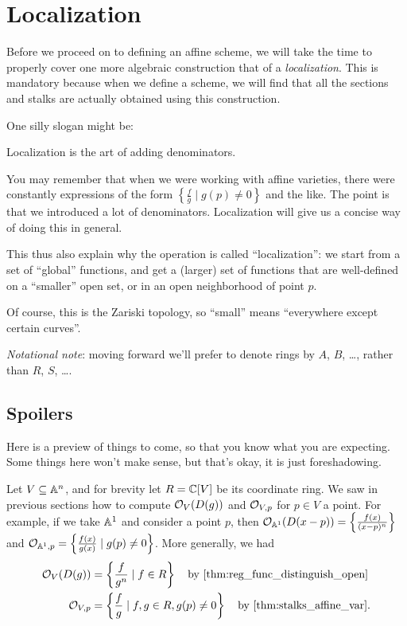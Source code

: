 \chapter{Localization}
\label{ch:localization}
Before we proceed on to defining an affine scheme,
we will take the time to properly cover one more algebraic construction
that of a \emph{localization}.
This is mandatory because when we define a scheme,
we will find that all the sections and stalks
are actually obtained using this construction.

One silly slogan might be:
\begin{moral}
	Localization is the art of adding denominators.
\end{moral}
You may remember that when we were working with affine varieties,
there were constantly expressions of the form
$\left\{ \frac{f}{g} \mid g(p) \neq 0 \right\}$
and the like.
The point is that we introduced a lot of denominators.
Localization will give us a concise way of doing this in general.

This thus also explain why the operation is called ``localization'':
we start from a set of ``global'' functions, and get a (larger) set of functions
that are well-defined on a ``smaller'' open set, or in an open neighborhood
of point $p$.

Of course, this is the Zariski topology, so ``small'' means ``everywhere except certain curves''.

\emph{Notational note}:
moving forward we'll prefer to denote rings by $A$, $B$, \dots,
rather than $R$, $S$, \dots.

\section{Spoilers}
Here is a preview of things to come,
so that you know what you are expecting.
Some things here won't make sense,
but that's okay, it is just foreshadowing.

Let $V \subseteq \mathbb A^n$, and for brevity let $R = \mathbb C[V]$ be its coordinate ring.
We saw in previous sections how to compute $\mathcal O_V(D(g))$
and $\mathcal O_{V, p}$ for $p \in V$ a point.
For example, if we take $\mathbb A^1$ and consider a point $p$, then
$\mathcal O_{\mathbb A^1}(D(x-p)) = \left\{ \frac{f(x)}{(x-p)^n} \right\}$
and $\mathcal O_{\mathbb A^1, p} = \left\{ \frac{f(x)}{g(x)} \mid g(p) \neq 0 \right\}$.
More generally, we had
\begin{align*}
	\OO_{V}(D(g)) &= \left\{ \frac{f}{g^n} \mid f \in R \right\}
		\quad\text{by \Cref{thm:reg_func_distinguish_open}} \\
	\OO_{V,p} &= \left\{ \frac{f}{g} \mid f,g \in R, g(p) \neq 0 \right\}
		\quad\text{by \Cref{thm:stalks_affine_var}}.
\end{align*}

